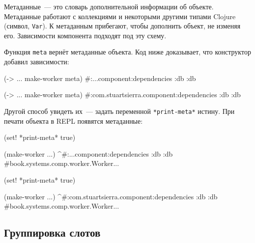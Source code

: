 Метаданные~--- это словарь дополнительной информации об объекте. Метаданные
работают с коллекциями и некоторыми другими типами Clojure (символ,
\verb|Var|). К метаданным прибегают, чтобы дополнить объект, не изменяя
его. Зависимости компонента подходят под эту схему.

Функция \verb|meta| вернёт метаданные объекта. Код ниже доказывает, что
конструктор добавил зависимости:

\ifnarrow

\begin{english}
  \begin{clojure}
(-> {...} make-worker meta)
#:...component{:dependencies {:db :db}}
  \end{clojure}
\end{english}

\else

\begin{english}
  \begin{clojure}
(-> {...} make-worker meta)
#:com.stuartsierra.component{:dependencies {:db :db}}
  \end{clojure}
\end{english}

\fi

Другой способ увидеть их~--- задать переменной \verb|*print-meta*| истину. При
печати объекта в REPL появятся метаданные:


\ifnarrow

\begin{english}
  \begin{clojure}
(set! *print-meta* true)

(make-worker {...})
^#:...component{:dependencies {:db :db}}
#book.systems.comp.worker.Worker{...}
  \end{clojure}
\end{english}

\else

\begin{english}
  \begin{clojure}
(set! *print-meta* true)

(make-worker {...})
^#:com.stuartsierra.component{:dependencies {:db :db}}
#book.systems.comp.worker.Worker{...}
  \end{clojure}
\end{english}

\fi

\subsection{Группировка слотов}


